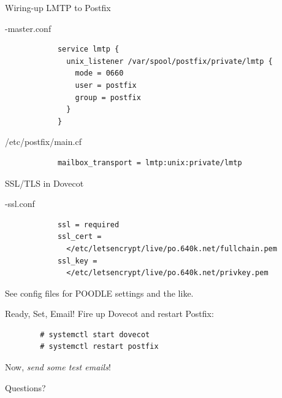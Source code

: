 \documentclass{lug}
\begin{document}
\begin{frame}[fragile]{Wiring-up LMTP to Postfix}
    \begin{block}{-master.conf}
        \begin{verbatim}
            service lmtp {
              unix_listener /var/spool/postfix/private/lmtp {
                mode = 0660
                user = postfix
                group = postfix
              }
            }
        \end{verbatim}
    \end{block}
    \begin{block}{\ttfamily /etc/postfix/main.cf}
        \begin{verbatim}
            mailbox_transport = lmtp:unix:private/lmtp
        \end{verbatim}
    \end{block}
\end{frame}

\begin{frame}[fragile]{SSL/TLS in Dovecot}
    \begin{block}{-ssl.conf}
        \begin{verbatim}
            ssl = required
            ssl_cert =
              </etc/letsencrypt/live/po.640k.net/fullchain.pem
            ssl_key =
              </etc/letsencrypt/live/po.640k.net/privkey.pem
        \end{verbatim}
    \end{block}
    \pause
    See config files for POODLE settings and the like.
\end{frame}

\begin{frame}[fragile]{Ready, Set, Email!}
    Fire up Dovecot and restart Postfix:
    \begin{verbatim}
        # systemctl start dovecot
        # systemctl restart postfix
    \end{verbatim}

    \pause

    Now, \emph{send some test emails}!
\end{frame}

\begin{frame}[standout]
    \Huge
    Questions?
\end{frame}
\end{document}
